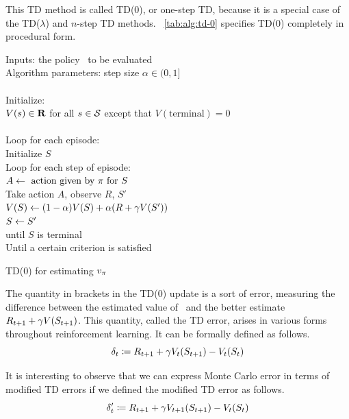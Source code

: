 This TD method is called TD(0),
or one-step TD,
because it is a special case of the TD($\lambda$)
and $n$-step TD methods.
\tablename~\ref{tab:alg:td-0} specifies TD(0) completely in procedural form.


\begin{table}
\beginalg
Inputs: the policy \pol\ to be evaluated\\
Algorithm parameters: step size $\alpha\in(0,1]$\\
\\
Initialize:\\
\>$V(s) \in \mathbf{R}$ for all $s \in \mathcal{S}$ except that $V(\mathrm{terminal}) = 0$ \\
\\
Loop for each episode:\\
\> Initialize $S$\\
\> Loop for each step of episode:\\
\> \> $A \leftarrow \mbox{ action given by } \pi \mbox{ for } S$\\
\> \> Take action $A$, observe $R$, $S'$\\
\> \> $V(S) \leftarrow (1-\alpha) V(S) + \alpha(R + \gamma V(S'))$\\
\> \> $S \leftarrow S'$\\
\> until $S$ is terminal\\
Until a certain criterion is satisfied
\endalg
\caption{TD(0) for estimating $v_{\pi}$}
\label{tab:alg:td-0}
\end{table}


The quantity in brackets in the TD(0) update is a sort of error,
measuring the difference between the estimated value of \
and the better estimate $R_{t+1} + \gamma V(S_{t+1})$.
This quantity, called the TD error, arises in various forms throughout reinforcement learning.
It can be formally defined as follows.
\begin{equation}
\label{eq:one-step-error}
\delta_{t} \coloneqq R_{t+1} + \gamma V_t(S_{t+1}) - V_t(S_{t})
\end{equation}

It is interesting to observe that we can express Monte Carlo error in terms of modified TD errors
if we defined the modified TD error as follows.
\begin{equation}
\label{eq:one-step-error-var}
\delta'_{t} \coloneqq R_{t+1} + \gamma V_{t+1}(S_{t+1}) - V_t(S_{t})
\end{equation}

